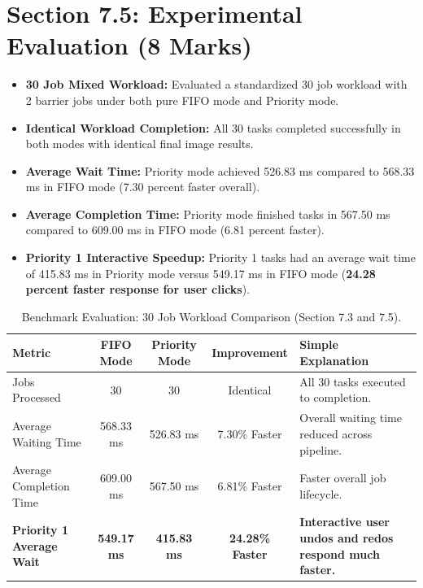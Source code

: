 \documentclass[10pt,a4paper]{article}
\begin{document}
\section{Section 7.5: Experimental Evaluation (8 Marks)}
\begin{itemize}
    \item \textbf{30 Job Mixed Workload:} Evaluated a standardized 30 job workload with 2 barrier jobs under both pure FIFO mode and Priority mode.
    \item \textbf{Identical Workload Completion:} All 30 tasks completed successfully in both modes with identical final image results.
    \item \textbf{Average Wait Time:} Priority mode achieved 526.83 ms compared to 568.33 ms in FIFO mode (7.30 percent faster overall).
    \item \textbf{Average Completion Time:} Priority mode finished tasks in 567.50 ms compared to 609.00 ms in FIFO mode (6.81 percent faster).
    \item \textbf{Priority 1 Interactive Speedup:} Priority 1 tasks had an average wait time of 415.83 ms in Priority mode versus 549.17 ms in FIFO mode (\textbf{24.28 percent faster response for user clicks}).
\end{itemize}

\begin{table}[h!]
\centering
\small
\begin{tabularx}{\textwidth}{l c c c X}
\toprule
\textbf{Metric} & \textbf{FIFO Mode} & \textbf{Priority Mode} & \textbf{Improvement} & \textbf{Simple Explanation} \\
\midrule
Jobs Processed & 30 & 30 & Identical & All 30 tasks executed to completion. \\
Average Waiting Time & 568.33 ms & 526.83 ms & 7.30\% Faster & Overall waiting time reduced across pipeline. \\
Average Completion Time & 609.00 ms & 567.50 ms & 6.81\% Faster & Faster overall job lifecycle. \\
\textbf{Priority 1 Average Wait} & \textbf{549.17 ms} & \textbf{415.83 ms} & \textbf{24.28\% Faster} & \textbf{Interactive user undos and redos respond much faster.} \\
\bottomrule
\end{tabularx}
\caption{Benchmark Evaluation: 30 Job Workload Comparison (Section 7.3 and 7.5).}
\end{table}
\end{document}

